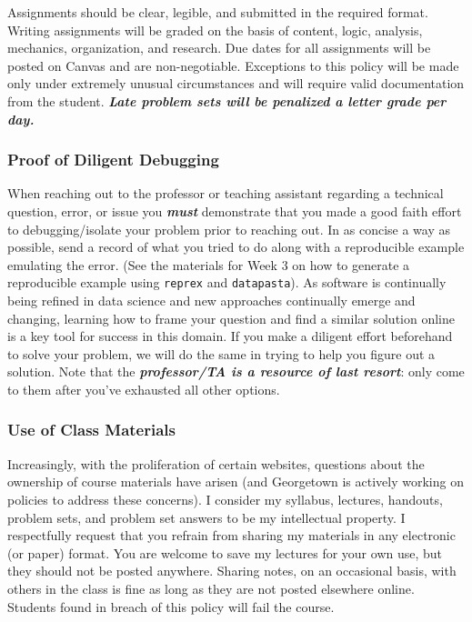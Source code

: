 \documentclass[
  12pt,
]{article}
\begin{document}
Assignments should be clear, legible, and submitted in the required
format. Writing assignments will be graded on the basis of content,
logic, analysis, mechanics, organization, and research. Due dates for
all assignments will be posted on Canvas and are non-negotiable.
Exceptions to this policy will be made only under extremely unusual
circumstances and will require valid documentation from the student.
\textbf{\emph{Late problem sets will be penalized a letter grade per
day.}}

\hypertarget{proof-of-diligent-debugging}{%
\subsubsection{Proof of Diligent
Debugging}\label{proof-of-diligent-debugging}}

When reaching out to the professor or teaching assistant regarding a
technical question, error, or issue you \textbf{\emph{must}} demonstrate
that you made a good faith effort to debugging/isolate your problem
prior to reaching out. In as concise a way as possible, send a record of
what you tried to do along with a reproducible example emulating the
error. (See the materials for Week 3 on how to generate a reproducible
example using \texttt{reprex} and \texttt{datapasta}). As software is
continually being refined in data science and new approaches continually
emerge and changing, learning how to frame your question and find a
similar solution online is a key tool for success in this domain. If you
make a diligent effort beforehand to solve your problem, we will do the
same in trying to help you figure out a solution. Note that the
\textbf{\emph{professor/TA is a resource of last resort}}: only come to
them after you've exhausted all other options.

\hypertarget{use-of-class-materials}{%
\subsubsection{Use of Class Materials}\label{use-of-class-materials}}

Increasingly, with the proliferation of certain websites, questions
about the ownership of course materials have arisen (and Georgetown is
actively working on policies to address these concerns). I consider my
syllabus, lectures, handouts, problem sets, and problem set answers to
be my intellectual property. I respectfully request that you refrain
from sharing my materials in any electronic (or paper) format. You are
welcome to save my lectures for your own use, but they should not be
posted anywhere. Sharing notes, on an occasional basis, with others in
the class is fine as long as they are not posted elsewhere online.
Students found in breach of this policy will fail the course.
\end{document}

